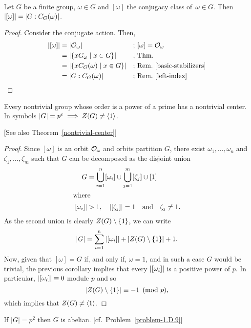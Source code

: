 \begin{cor}
    Let $G$ be a finite group, $\omega \in G$ and\/ $[\omega]$ the conjugacy class of\/~$\omega\in G$. Then $\left\vert{[\omega]}\right\vert = \left\vert{G:C_G(\omega)}\right\vert$.
\end{cor}

\begin{proof} Consider the conjugate action. Then,
\begin{align*}
    \left\vert{[\omega]}\right\vert &= \left\vert{{\cal O}_\omega}\right\vert&&\textrm{; $[\omega]={\cal O}_\omega$}\\
        &= \left\vert{\{xG_\omega\mid x\in G\}}\right\vert&&\textrm{; Thm.}\\
        &= \left\vert{\{xC_G(\omega)\mid x\in G\}}\right\vert&&\textrm{; Rem.~\ref{basic-stabilizers}}\\
        &= \left\vert{G:C_G(\omega)}\right\vert&&\textrm{; Rem.~\ref{left-index}}
\end{align*}
 \end{proof}

\begin{cor}\label{p-groups-have-center}
    Every nontrivial group whose order is a power of a prime has a nontrivial center. In symbols $\left\vert{G}\right\vert=p^e\implies Z(G)\ne\langle1\rangle$.
    
    \textrm{\rm[See also Theorem~\ref{nontrivial-center}]}
\end{cor}

\begin{proof} Since $[\omega]$ is an orbit ${\cal O}_\omega$ and orbits partition $G$, there exist $\omega_1,\dots,\omega_n$ and $\zeta_1,\dots,\zeta_m$ such that $G$ can be decomposed as the disjoint union
\begin{align*}
    G &= \bigcup_{i=1}^n[\omega_i] \cup \bigcup_{j=1}^m[\zeta_j] \cup[1]\\
    \intertext{where}
    \left\vert{[\omega_i]}\right\vert&>1,\quad\left\vert{[\zeta_j]}\right\vert=1\quad\text{and}\quad \zeta_j\ne1.
\end{align*}
 As the second union is clearly $Z(G)\setminus\{1\}$, we can write
 $$
    \left\vert{G}\right\vert = \sum_{i=1}^n|[\omega_i]| + |Z(G)\setminus\{1\}| + 1.
 $$
 Now, given that $[\omega]=G$ if, and only if, $\omega=1$, and in such a case $G$ would be trivial, the previous corollary implies that every $\left\vert{[\omega_i]}\right\vert$ is a positive power of $p$. In particular, $\left\vert{[\omega_i]}\right\vert\equiv0$ module $p$ and so
 $$
    |Z(G)\setminus\{1\}|\equiv-1\pmod p,
 $$
which implies that $Z(G)\ne\langle1\rangle$.  \end{proof}

\begin{cor}\label{p-squared-is-abelian}
    If\/ $|G|=p^2$ then $G$ is abelian. \textrm{\rm [cf.~Problem~\ref{problem-1.D.9}]}
\end{cor}

